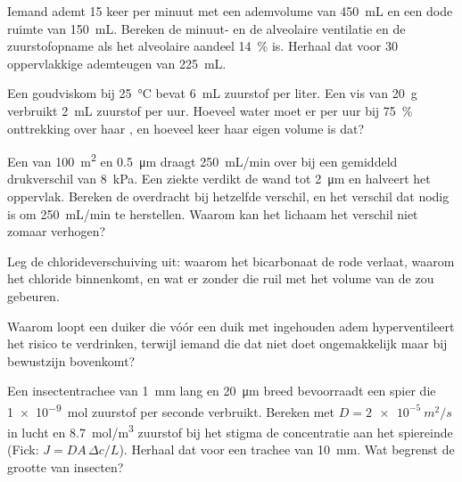 \begin{exercise}[$\star\star$]\label{exo:b1:gas-exchange:5}
Iemand ademt \qty{15}{} keer per minuut met een ademvolume van \qty{450}{mL} en een
dode ruimte van \qty{150}{mL}. Bereken de minuut- en de alveolaire ventilatie en de
zuurstofopname als het alveolaire aandeel \qty{14}{\%} is. Herhaal dat voor
\qty{30}{} oppervlakkige ademteugen van \qty{225}{mL}.
\end{exercise}

\begin{exercise}[$\star\star$]\label{exo:b1:gas-exchange:6}
Een goudviskom bij \qty{25}{\celsius} bevat \qty{6}{mL} zuurstof per liter. Een vis
van \qty{20}{g} verbruikt \qty{2}{mL} zuurstof per uur. Hoeveel water moet er per
uur bij \qty{75}{\%} onttrekking over haar , en hoeveel keer haar eigen
volume is dat?
\end{exercise}

\begin{exercise}[$\star\star$]\label{exo:b1:gas-exchange:7}
Een  van \qty{100}{m^2} en \qty{0.5}{\micro m} draagt \qty{250}{mL/min} over
bij een gemiddeld drukverschil van \qty{8}{kPa}. Een ziekte verdikt de wand tot
\qty{2}{\micro m} en halveert het oppervlak. Bereken de overdracht bij hetzelfde
verschil, en het verschil dat nodig is om \qty{250}{mL/min} te herstellen. Waarom
kan het lichaam het verschil niet zomaar verhogen?
\end{exercise}

\begin{exercise}[$\star\star$]\label{exo:b1:gas-exchange:8}
Leg de chlorideverschuiving uit: waarom het bicarbonaat de rode  verlaat, waarom
het chloride binnenkomt, en wat er zonder die ruil met het volume van de  zou
gebeuren.
\end{exercise}

\begin{exercise}[$\star\star$]\label{exo:b1:gas-exchange:9}
Waarom loopt een duiker die vóór een duik met ingehouden adem hyperventileert het
risico te verdrinken, terwijl iemand die dat niet doet ongemakkelijk maar bij
bewustzijn bovenkomt?
\end{exercise}

\begin{exercise}[$\star\star\star$]\label{exo:b1:gas-exchange:10}
Een insectentrachee van \qty{1}{mm} lang en \qty{20}{\micro m} breed bevoorraadt
een spier die \qty{1e-9}{mol} zuurstof per seconde verbruikt. Bereken met
$D = \qty{2e-5}{m^2/s}$ in lucht en \qty{8.7}{mol/m^3} zuurstof bij het stigma de
concentratie aan het spiereinde (Fick: $J = DA\,\Delta c/L$). Herhaal dat voor een
trachee van \qty{10}{mm}. Wat begrenst de grootte van insecten?
\end{exercise}

